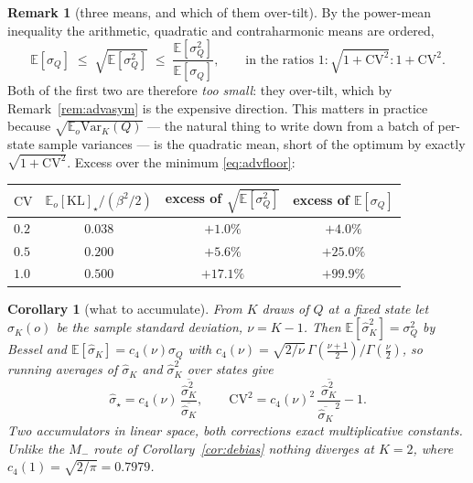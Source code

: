 \documentclass[11pt]{article}
\newtheorem{corollary}[proposition]{Corollary}
\theoremstyle{definition}
\newtheorem{remark}[proposition]{Remark}
\newcommand{\Var}{\mathrm{Var}}
\newcommand{\E}{\mathbb{E}}
\begin{document}
\begin{remark}[three means, and which of them over-tilt]
\label{rem:threemeans}
By the power-mean inequality the arithmetic, quadratic and contraharmonic means
are ordered,
\begin{equation}
  \E[\sigma_Q]\;\le\;\sqrt{\E[\sigma_Q^2]}\;\le\;\frac{\E[\sigma_Q^2]}{\E[\sigma_Q]},
  \qquad\text{in the ratios } 1:\sqrt{1+\mathrm{CV}^2}:1+\mathrm{CV}^2 .
\end{equation}
Both of the first two are therefore \emph{too small}: they over-tilt, which by
Remark~\ref{rem:advasym} is the expensive direction. This matters in practice
because $\sqrt{\E_o \Var_K(Q)}$ --- the natural thing to write down from a batch
of per-state sample variances --- is the quadratic mean, short of the optimum by
exactly $\sqrt{1+\mathrm{CV}^2}$. Excess over the minimum \eqref{eq:advfloor}:
\begin{center}\small
\begin{tabular}{lccc}
\toprule
$\mathrm{CV}$ & $\E_o[\mathrm{KL}]_\star/(\beta^2/2)$
  & excess of $\sqrt{\E[\sigma_Q^2]}$ & excess of $\E[\sigma_Q]$ \\
\midrule
$0.2$ & $0.038$ & $+1.0\%$  & $+4.0\%$ \\
$0.5$ & $0.200$ & $+5.6\%$  & $+25.0\%$ \\
$1.0$ & $0.500$ & $+17.1\%$ & $+99.9\%$ \\
\bottomrule
\end{tabular}
\end{center}
\end{remark}

\begin{corollary}[what to accumulate]
\label{cor:advaccum}
From $K$ draws of $Q$ at a fixed state let $\hat\sigma_K(o)$ be the sample
standard deviation, $\nu=K-1$. Then $\E[\hat\sigma_K^2]=\sigma_Q^2$ by Bessel and
$\E[\hat\sigma_K]=c_4(\nu)\sigma_Q$ with
$c_4(\nu)=\sqrt{2/\nu}\,\Gamma(\tfrac{\nu+1}{2})/\Gamma(\tfrac\nu2)$, so running
averages of $\hat\sigma_K$ and $\hat\sigma_K^2$ over states give
\begin{equation}
  \hat\sigma_\star=c_4(\nu)\,\frac{\overline{\hat\sigma_K^2}}{\overline{\hat\sigma_K}},
  \qquad
  \mathrm{CV}^2=c_4(\nu)^2\,
  \frac{\overline{\hat\sigma_K^2}}{\overline{\hat\sigma_K}^{\,2}}-1 .
  \label{eq:advaccum}
\end{equation}
Two accumulators in \emph{linear} space, both corrections exact multiplicative
constants. Unlike the $M_-$ route of Corollary~\ref{cor:debias} nothing diverges
at $K=2$, where $c_4(1)=\sqrt{2/\pi}=0.7979$.
\end{corollary}
\end{document}
